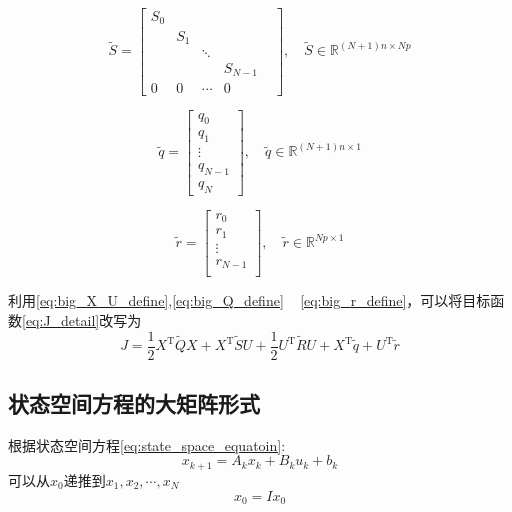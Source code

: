 \documentclass[withoutpreface,bwprint]{NoteBook}
\begin{document}
\begin{equation}
\label{eq:big_S_define}
\tilde{S} = \begin{bmatrix}
S_0 & & & \\
& S_1 & &  \\
& & \ddots &  \\
& & & S_{N-1} \\
0 & 0 & \cdots & 0 & 
\end{bmatrix}
,\quad \tilde{S} \in \mathbb{R}^{(N+1) n \times N p}
\end{equation}

\begin{equation}
\label{eq:big_q_define}
\tilde{q} = \begin{bmatrix}
q_0\\
q_1 \\
\vdots \\
q_{N-1} \\
q_{N}
\end{bmatrix}
,\quad \tilde{q} \in \mathbb{R}^{(N+1) n \times 1}
\end{equation}

\begin{equation}
\label{eq:big_r_define}
\tilde{r} = \begin{bmatrix}
r_0\\
r_1 \\
\vdots \\
r_{N-1} \\
\end{bmatrix}
,\quad \tilde{r} \in \mathbb{R}^{N p \times 1}
\end{equation}


利用\cref{eq:big_X_U_define},\cref{eq:big_Q_define} ~ \cref{eq:big_r_define}，可以将目标函数\cref{eq:J_detail}改写为
\begin{equation}
\label{eq:J_big_matrix}
J = \frac{1}{2} X^\mathrm{T}\tilde{Q}X + X^\mathrm{T}\tilde{S} U + \frac{1}{2} U^\mathrm{T}\tilde{R}U + X^\mathrm{T}\tilde{q} + U^\mathrm{T}\tilde{r}
\end{equation}

\subsection{状态空间方程的大矩阵形式}

根据状态空间方程\cref{eq:state_space_equatoin}:
$$
x_{k+1} = A_k x_k + B_k u_k + b_k
$$
可以从$x_0$递推到$x_1,x_2,\cdots,x_N$​
\begin{equation}
\label{eq:x_0}
x_0 = I x_0 
\end{equation}
\end{document}
